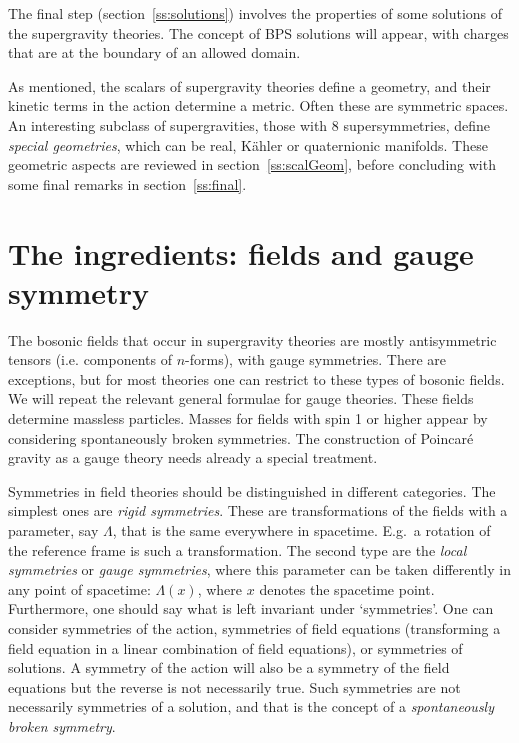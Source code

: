 \documentclass[a4paper,11pt,twoside]{article}
\begin{document}
The final step (section~\ref{ss:solutions}) involves the properties of
some solutions of the supergravity theories. The concept of BPS solutions
will appear, with charges that are at the boundary of an allowed domain.

As mentioned, the scalars of supergravity theories define a geometry, and
their kinetic terms in the action determine a metric. Often these are
symmetric spaces. An interesting subclass of supergravities, those with 8
supersymmetries, define \emph{special geometries}, which can be real,
K{\"a}hler or quaternionic manifolds. These geometric aspects are reviewed in
section~\ref{ss:scalGeom}, before concluding with some final remarks in
section~\ref{ss:final}.

\section{The ingredients: fields and gauge symmetry} \label{ss:bosIngred}

The bosonic fields that occur in supergravity theories are mostly
antisymmetric tensors (i.e. components of $n$-forms), with gauge
symmetries. There are exceptions, but for most theories one can restrict
to these types of bosonic fields. We will repeat the relevant general
formulae for gauge theories. These fields determine massless particles.
Masses for fields with spin 1 or higher appear by considering
spontaneously broken symmetries. The construction of Poincar{\'e} gravity as
a gauge theory needs already a special treatment.

Symmetries in field theories should be distinguished in different
categories. The simplest ones are \emph{rigid symmetries}. These are
transformations of the fields with a parameter, say $\Lambda $, that is
the same everywhere in spacetime. E.g.\ a rotation of the reference frame
is such a transformation. The second type are the \emph{local symmetries}
or \emph{gauge symmetries}, where this parameter can be taken differently
in any point of spacetime: $\Lambda (x)$, where $x$ denotes the spacetime
point. Furthermore, one should say what is left invariant under
`symmetries'. One can consider symmetries of the action, symmetries of
field equations (transforming a field equation in a linear combination of
field equations), or symmetries of solutions. A symmetry of the action
will also be a symmetry of the field equations but the reverse is not
necessarily true. Such symmetries are not necessarily symmetries of a
solution, and that is the concept of a \emph{spontaneously broken
symmetry}.
\end{document}
